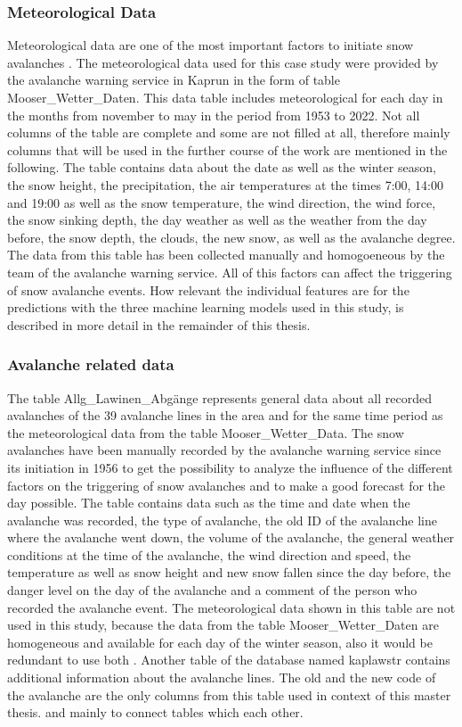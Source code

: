 \documentclass[../masterarbeit.tex]{subfiles}
\begin{document}
 


\subsubsection{Meteorological Data}
Meteorological data are one of the most important factors to initiate snow avalanches \textcite[]{Bahram:2019}. The meteorological data used for this case study were provided by the avalanche warning service in Kaprun in the form of table Mooser\_Wetter\_Daten.
This data table includes meteorological for each day in the months from november to may in the period from 1953 to 2022. Not all columns of the table are complete and some are not filled at all, therefore mainly columns that will be used in the further course of the work are mentioned in the following. The table contains data about the date as well as the winter season, the snow height, the precipitation, the air temperatures at the times 7:00, 14:00 and 19:00 as well as the snow temperature, the wind direction, the wind force, the snow sinking depth, the day weather as well as the weather from the day before, the snow depth, the clouds, the new snow, as well as the avalanche degree. The data from this table has been collected manually and homogoeneous by the team of the avalanche warning service. All of this factors can affect the triggering of snow avalanche events. How relevant the individual features are for the predictions with the three machine learning models used in this study, is described in more detail in the remainder of this thesis.



\subsubsection{Avalanche related data}
The table Allg\_Lawinen\_Abgänge represents general data about all recorded avalanches of the 39 avalanche lines in the area and for the same time period as the meteorological data from the table Mooser\_Wetter\_Data. The snow avalanches have been manually recorded by the avalanche warning service since its initiation in 1956 to get the possibility to analyze the influence of the different factors on the triggering of snow avalanches and to make a good forecast for the day possible. The table contains data such as the time and date when the avalanche was recorded, the type of avalanche, the old ID of the avalanche line where the avalanche went down, the volume of the avalanche, the general weather conditions at the time of the avalanche, the wind direction and speed, the temperature as well as snow height and new snow fallen since the day before, the danger level on the day of the avalanche and a comment of the person who recorded the avalanche event. The meteorological data shown in this table are not used in this study, because the data from the table Mooser\_Wetter\_Daten are homogeneous and available for each day of the winter season, also it would be redundant to use both .
Another table of the database named kaplawstr contains additional information about the avalanche lines. The old and the new code of the avalanche are the only columns from this table used in context of this master thesis. and mainly to connect tables which each other.
\end{document}
